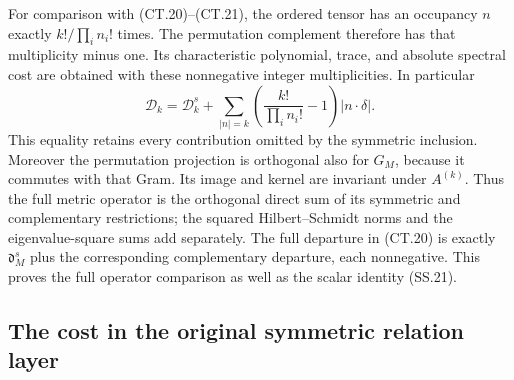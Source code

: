 For comparison with (CT.20)--(CT.21), the ordered tensor has an
occupancy \(n\) exactly \(k!/\prod_i n_i!\) times.  The
permutation complement therefore has that multiplicity minus one.
Its characteristic polynomial, trace, and absolute spectral cost are
obtained with these nonnegative integer multiplicities.  In particular
\[
 \mathcal D_k=\mathcal D_k^s+
       \sum_{|n|=k}\left(\frac{k!}{\prod_i n_i!}-1\right)
                                  |n\cdot\delta|.       \tag{SS.21}
\]
This equality retains every contribution omitted by the symmetric
inclusion.  Moreover the permutation projection is orthogonal also
for \(G_M\), because it commutes with that Gram.  Its image and
kernel are invariant under \(A^{(k)}\).  Thus the full metric
operator is the orthogonal direct sum of its symmetric and
complementary restrictions; the squared Hilbert--Schmidt norms and
the eigenvalue-square sums add separately.  The full departure in
(CT.20) is exactly \(\mathfrak d_M^s\) plus the corresponding
complementary departure, each nonnegative.  This proves the full
operator comparison as well as the scalar identity (SS.21).

\subsection{The cost in the original symmetric relation layer}

